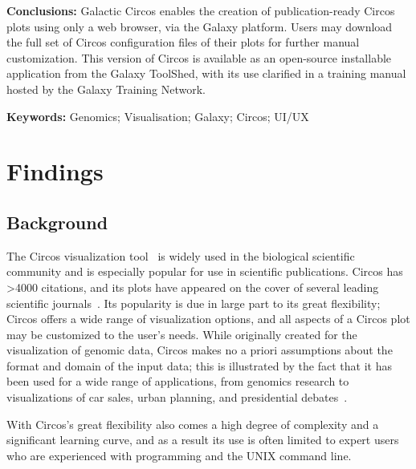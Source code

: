 \textbf{Conclusions:}
Galactic Circos enables the creation of publication-ready Circos plots using only a web browser, via the Galaxy platform. Users may download the full set of Circos configuration files of their plots for further manual customization. This version of Circos is available as an open-source installable application from the Galaxy ToolShed, with its use clarified in a training manual hosted by the Galaxy Training Network.

\textbf{Keywords: } Genomics; Visualisation; Galaxy; Circos; UI/UX


\section*{Findings}

\subsection*{Background}


The Circos visualization tool~\cite{krzywinski2009} is widely used in the biological scientific community and is especially popular for use in scientific publications. Circos has >4000 citations, and its plots have appeared on the cover of several leading scientific journals~\cite{circospubs}.  Its popularity is due in large part to its great flexibility; Circos offers a wide range of visualization options, and all aspects of a Circos plot may be customized to the user’s needs. While originally created for the visualization of genomic data, Circos makes no a priori assumptions about the format and domain of the input data; this is illustrated by the fact that it has been used for a wide range of applications, from genomics research to visualizations of car sales, urban planning, and presidential debates~\cite{circosnongenomic}.

With Circos's great flexibility also comes a high degree of complexity and a significant learning curve, and as a result its use is often limited to expert users who are experienced with programming and the UNIX command line.

